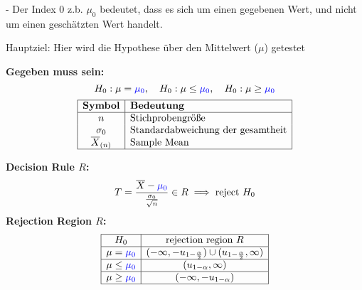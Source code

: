 - Der Index 0 z.b. $\mu_0$ bedeutet, dass es sich um einen gegebenen Wert, und nicht um einen geschätzten Wert handelt.

\begin{center}

Hauptziel: Hier wird die Hypothese über den
Mittelwert ($\mu$) getestet
\end{center}
\begin{center}
\end{center}


\large{\textbf{Gegeben muss sein:}}
\[
H_0: \mu = \textcolor{blue}{\mu_0}, \quad H_0: \mu \leq \textcolor{blue}{\mu_0}, \quad H_0: \mu \geq \textcolor{blue}{\mu_0}
\]
\[
\begin{array}{|c|l|}
\hline
\textbf{Symbol} & \textbf{Bedeutung} \\
\hline
n & \text{Stichprobengröße} \\
\sigma_0 & \text{Standardabweichung der gesamtheit} \\
\overline{X}_{(n)} & \text{Sample Mean} \\
\hline
\end{array}
\]

\normalsize
\begin{comment}
\large{\textbf{Teststatistik:}}
\[
T = \frac{\overline{X}_{(n)} - \textcolor{blue}{\mu}}{\frac{\sigma_0}{\sqrt{n}}} \sim N(0,1)
\]
\end{comment}
\large{\textbf{Decision Rule  \(R\):}}
\[
T = \frac{\overline{X} - \textcolor{blue}{\mu_0}}{\frac{\sigma_0}{\sqrt{n}}} \in R \implies \text{reject } H_0
\]
\large{\textbf{Rejection Region \(R\):}}
\[
\begin{array}{|c|c|}
\hline
H_0 & \text{rejection region } R \\ \hline
\mu = \textcolor{blue}{\mu_0} & (-\infty, -u_{1-\frac{\alpha}{2}}) \cup (u_{1-\frac{\alpha}{2}}, \infty) \\ \hline
\mu \leq \textcolor{blue}{\mu_0} & (u_{1-\alpha}, \infty) \\ \hline
\mu \geq \textcolor{blue}{\mu_0} & (-\infty, -u_{1-\alpha}) \\ \hline
\end{array}
\]

